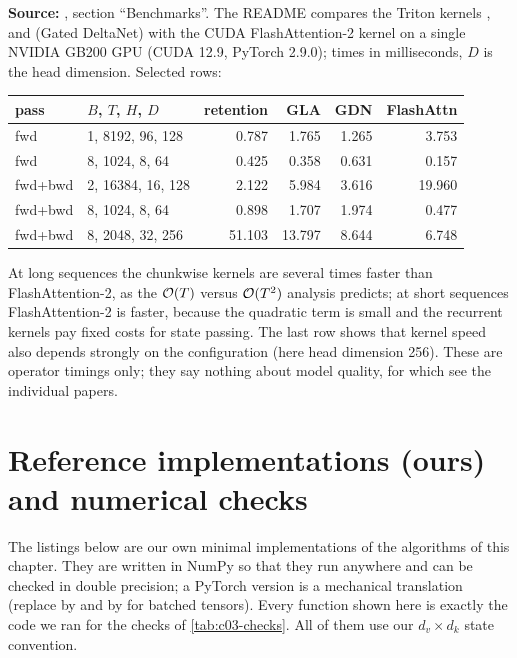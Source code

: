 \begin{sloppypar}
\begin{results}
\textbf{Source:} , section
``Benchmarks''. The README compares the Triton kernels ,
 and  (Gated DeltaNet) with the CUDA FlashAttention-2 kernel on
a single NVIDIA GB200 GPU (CUDA 12.9, PyTorch 2.9.0); times in milliseconds, $D$ is the head
dimension. Selected rows:
\begin{center}
\small
\begin{tabular}{llrrrr}
\toprule
pass & $B$, $T$, $H$, $D$ & retention & GLA & GDN & FlashAttn \\
\midrule
fwd & 1, 8192, 96, 128 & 0.787 & 1.765 & 1.265 & 3.753 \\
fwd & 8, 1024, 8, 64 & 0.425 & 0.358 & 0.631 & 0.157 \\
fwd+bwd & 2, 16384, 16, 128 & 2.122 & 5.984 & 3.616 & 19.960 \\
fwd+bwd & 8, 1024, 8, 64 & 0.898 & 1.707 & 1.974 & 0.477 \\
fwd+bwd & 8, 2048, 32, 256 & 51.103 & 13.797 & 8.644 & 6.748 \\
\bottomrule
\end{tabular}
\end{center}
At long sequences the chunkwise kernels are several times faster than FlashAttention-2, as the
$\mathcal{O}(T)$ versus $\mathcal{O}(T^2)$ analysis predicts; at short sequences FlashAttention-2 is faster,
because the quadratic term is small and the recurrent kernels pay fixed costs for state passing.
The last row shows that kernel speed also depends strongly on the configuration (here head
dimension 256). These are operator timings only; they say nothing about model quality, for which
see the individual papers.
\end{results}

\end{sloppypar}

\section{Reference implementations (ours) and numerical checks}\label{sec:c03-ours}

The listings below are our own minimal implementations of the algorithms of this chapter. They
are written in NumPy so that they run anywhere and can be checked in double precision; a
PyTorch version is a mechanical translation (replace  by  and  by
 for batched tensors). Every function shown here is exactly the code we ran for the
checks of \cref{tab:c03-checks}. All of them use our $d_v\times d_k$ state convention.


